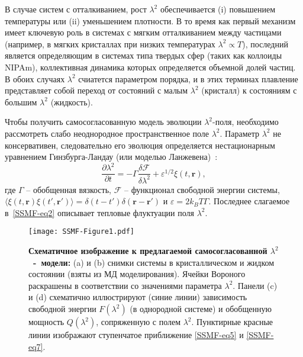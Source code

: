 В случае систем с отталкиванием, рост $\lambda^2$ обеспечивается (i) повышением температуры или (ii) уменьшением плотности.
В то время как первый механизм имеет ключевую роль в системах с мягким отталкиванием между частицами (например, в мягких кристаллах при низких температурах $\lambda^2\propto T $), последний является определяющим в системах типа твердых сфер (таких как коллоиды NIPAm), коллективная динамика которых определяется объемной долей частиц.
В обоих случаях $\lambda^2$ счиатется параметром порядка, и в этих терминах плавление представляет собой переход от состояний с малым $\lambda^2$ (кристалл) к состояниям с большим $\lambda^2$ (жидкость).

Чтобы получить самосогласованную модель эволюции $ \lambda^2$-поля,
необходимо рассмотреть слабо неоднородное пространственное поле $\lambda^2$.
Параметр $\lambda ^ 2$ не консервативен, следовательно его эволюция определяется нестационарным уравнением Гинзбурга-Ландау (или моделью Ланжевена)~\cite{book.desai}:
\begin{equation}
\label{SSMF-eq4}
\frac{\partial \lambda^2}{\partial t} = -\Gamma \frac{\delta \mathcal{F}}{\delta \lambda^2} + \varepsilon^{1/2}\xi(t,\mathbf{r}),
\end{equation}
где $\Gamma$ -- обобщенная вязкость, $ \mathcal{F} $ -- функционал свободной энергии системы, $\langle \xi(t,\mathbf{r})\xi(t',\mathbf{r}')\rangle = \delta(t-t')\delta(\mathbf{r}-\mathbf{r}')$ и $\varepsilon = 2k_BT\Gamma$.
Последнее слагаемое в~\eqref{SSMF-eq2} описывает тепловые флуктуации поля $\lambda^2$.

\begin{figure}[!t]
\centering
  \texttt{[image: SSMF-Figure1.pdf]}
  \caption{\textbf{Схематичное изображение к предлагаемой самосогласованной $\lambda^2$~-~модели:}
  (a) и (b) снимки системы в кристаллическом и жидком состоянии (взяты из МД моделирования).
  Ячейки Вороного раскрашены в соответствии со значениями параметра $ \lambda^2$.
  Панели (c) и (d) схематично иллюстрируют (синие линии) зависимость свободной энергии $ F (\lambda ^ 2) $ (в однородной системе) и обобщенную мощность $ Q (\lambda ^ 2) $, сопряженную с полем $\lambda^2$.
  Пунктирные красные линии изображают ступенчатое приближение \eqref{SSMF-eq5} и \eqref{SSMF-eq7}.
  }
\label{SSMF-Figure1}
\end{figure}


